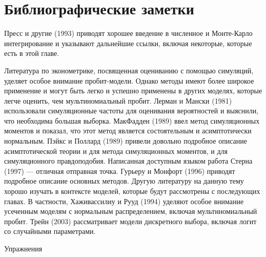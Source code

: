 \section{Библиографические заметки}

Пресс и другие (1993) приводят хорошее введение в численное и Монте-Карло интегрирование и указывают дальнейшие ссылки, включая некоторые, которые есть в этой главе.

Литература по эконометрике, посвященная оцениванию с помощью симуляций, уделяет особое внимание пробит-модели. Однако методы имеют более широкое применение и могут быть легко и успешно применены в других моделях, которые легче оценить, чем  мультиномиальный пробит. Лерман и Мански (1981) использовали симуляционные частоты для оценивания вероятностей и выяснили, что необходима большая выборка. МакФадден (1989) ввел метод симуляционных моментов и показал, что этот метод является состоятельным и асимптотически нормальным. Пэйкс и Поллард (1989) привели довольно подробное описание асимптотической теории и для метода симуляционных моментов, и для симуляционного правдоподобия. Написанная доступным языком работа Стерна (1997) --- отличная отправная точка. Гурьеру и Монфорт (1996) приводят подробное описание основных методов. Другую литературу на данную тему хорошо изучать в контексте моделей, которые будут рассмотрены с последующих главах. В частности, Хаживассилиу и Рууд (1994) уделяют особое внимание усеченным моделям с нормальным распределением, включая мультиномиальный пробит. Трейн (2003) рассматривает модели дискретного выбора, включая логит со случайными параметрами. 


\begin{center}
Упражнения
\end{center}


